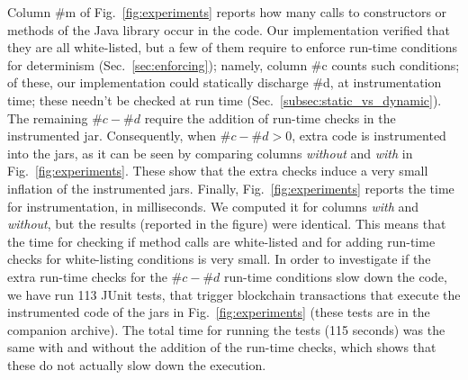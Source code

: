 Column \#m of Fig.~\ref{fig:experiments} reports how many calls to constructors
or methods of the Java library occur in the code. Our implementation
verified that they are all white-listed,
but a few of them require to enforce run-time conditions for determinism
(Sec.~\ref{sec:enforcing}); namely, column \#c counts such conditions;
of these, our implementation could statically discharge \#d, at instrumentation time; these needn't
be checked at run time (Sec.~\ref{subsec:static_vs_dynamic}). The remaining
$\#c - \#d$ require the addition of run-time checks in the instrumented jar. Consequently,
when $\#c - \#d > 0$, extra code is instrumented into the jars, as it can be seen by comparing
columns \emph{without} and \emph{with} in Fig.~\ref{fig:experiments}. These
show that the extra checks induce a very small inflation of the instrumented jars.
Finally, Fig.~\ref{fig:experiments} reports the time for instrumentation, in milliseconds.
We computed it for columns \emph{with} and \emph{without}, but the results
(reported in the figure) were identical. This means that the time for
checking if method calls are white-listed and for adding run-time checks for white-listing
conditions is very small.
In order to investigate if the extra run-time checks for the $\#c - \#d$ run-time conditions
slow down the code, we have run 113 JUnit tests, that trigger blockchain transactions
that execute the instrumented code of the jars in Fig.~\ref{fig:experiments}
(these tests are in the companion archive). The total time for running the
tests (115 seconds) was the same with and without the addition of the run-time checks, which shows that
these do not actually slow down the execution.
